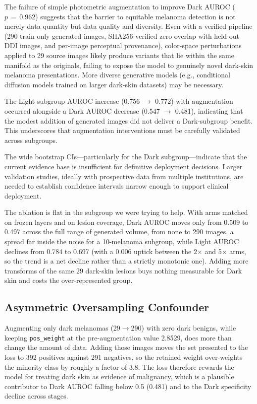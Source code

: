 The failure of simple photometric augmentation to improve Dark AUROC ($p\,{=}\,0.962$) suggests that the barrier to equitable melanoma detection is not merely data quantity but data quality and diversity. Even with a verified pipeline (290 train-only generated images, SHA256-verified zero overlap with held-out DDI images, and per-image perceptual provenance), color-space perturbations applied to 29 source images likely produce variants that lie within the same manifold as the originals, failing to expose the model to genuinely novel dark-skin melanoma presentations. More diverse generative models (e.g., conditional diffusion models trained on larger dark-skin datasets) may be necessary.

The Light subgroup AUROC increase (0.756 $\rightarrow$ 0.772) with augmentation occurred alongside a Dark AUROC decrease (0.547 $\rightarrow$ 0.481), indicating that the modest addition of generated images did not deliver a Dark-subgroup benefit. This underscores that augmentation interventions must be carefully validated across subgroups.

The wide bootstrap CIs---particularly for the Dark subgroup---indicate that the current evidence base is insufficient for definitive deployment decisions. Larger validation studies, ideally with prospective data from multiple institutions, are needed to establish confidence intervals narrow enough to support clinical deployment.

The ablation is flat in the subgroup we were trying to help. With arms matched on frozen layers and on lesion coverage, Dark AUROC moves only from 0.509 to 0.497 across the full range of generated volume, from none to 290 images, a spread far inside the noise for a 10-melanoma subgroup, while Light AUROC declines from 0.784 to 0.697 (with a 0.006 uptick between the 2$\times$ and 5$\times$ arms, so the trend is a net decline rather than a strictly monotonic one). Adding more transforms of the same 29 dark-skin lesions buys nothing measurable for Dark skin and costs the over-represented group.

\subsection{Asymmetric Oversampling Confounder}

Augmenting only dark melanomas (29$\to$290) with zero dark benigns, while keeping \texttt{pos\_weight} at the pre-augmentation value 2.8529, does more than change the amount of data. Adding those images moves the set presented to the loss to 392 positives against 291 negatives, so the retained weight over-weights the minority class by roughly a factor of 3.8. The loss therefore rewards the model for treating dark skin as evidence of malignancy, which is a plausible contributor to Dark AUROC falling below 0.5 (0.481) and to the Dark specificity decline across stages.

